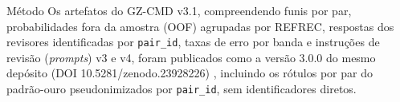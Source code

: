 \begin{chapter}{Método}
Os artefatos do GZ-CMD v3.1, compreendendo funis por par, probabilidades fora da amostra (OOF) agrupadas por REFREC, respostas dos revisores identificadas por \texttt{pair\_id}, taxas de erro por banda e instruções de revisão (\textit{prompts}) v3 e v4, foram publicados como a versão 3.0.0 do mesmo depósito (DOI 10.5281/zenodo.23928226) \cite{Jardim2026zenodoGzcmd}, incluindo os rótulos por par do padrão-ouro pseudonimizados por \texttt{pair\_id}, sem identificadores diretos.

\end{chapter}

